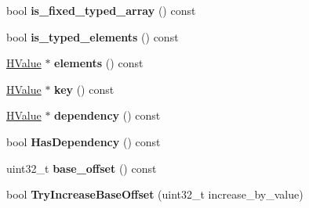 \begin{DoxyCompactItemize}
\item 
\hypertarget{classv8_1_1internal_1_1_v8___f_i_n_a_l_ab3329241dbd5a19616fb0a0346af317d}{}bool {\bfseries is\+\_\+fixed\+\_\+typed\+\_\+array} () const \label{classv8_1_1internal_1_1_v8___f_i_n_a_l_ab3329241dbd5a19616fb0a0346af317d}

\item 
\hypertarget{classv8_1_1internal_1_1_v8___f_i_n_a_l_a558e6bb397abd3937d39e3941acd7ea9}{}bool {\bfseries is\+\_\+typed\+\_\+elements} () const \label{classv8_1_1internal_1_1_v8___f_i_n_a_l_a558e6bb397abd3937d39e3941acd7ea9}

\item 
\hypertarget{classv8_1_1internal_1_1_v8___f_i_n_a_l_a91287e8759f25c1fd30e3bc43b1d0582}{}\hyperlink{classv8_1_1internal_1_1_h_value}{H\+Value} $\ast$ {\bfseries elements} () const \label{classv8_1_1internal_1_1_v8___f_i_n_a_l_a91287e8759f25c1fd30e3bc43b1d0582}

\item 
\hypertarget{classv8_1_1internal_1_1_v8___f_i_n_a_l_aecac5f6b59aaff1b8ba60417c772e136}{}\hyperlink{classv8_1_1internal_1_1_h_value}{H\+Value} $\ast$ {\bfseries key} () const \label{classv8_1_1internal_1_1_v8___f_i_n_a_l_aecac5f6b59aaff1b8ba60417c772e136}

\item 
\hypertarget{classv8_1_1internal_1_1_v8___f_i_n_a_l_a2dc4fa79ff1b05f63414663e54be99fd}{}\hyperlink{classv8_1_1internal_1_1_h_value}{H\+Value} $\ast$ {\bfseries dependency} () const \label{classv8_1_1internal_1_1_v8___f_i_n_a_l_a2dc4fa79ff1b05f63414663e54be99fd}

\item 
\hypertarget{classv8_1_1internal_1_1_v8___f_i_n_a_l_afa85f10e0771e676cbc3526f47ab6855}{}bool {\bfseries Has\+Dependency} () const \label{classv8_1_1internal_1_1_v8___f_i_n_a_l_afa85f10e0771e676cbc3526f47ab6855}

\item 
\hypertarget{classv8_1_1internal_1_1_v8___f_i_n_a_l_a00906b3ab3463ca74c5999407333630a}{}uint32\+\_\+t {\bfseries base\+\_\+offset} () const \label{classv8_1_1internal_1_1_v8___f_i_n_a_l_a00906b3ab3463ca74c5999407333630a}

\item 
\hypertarget{classv8_1_1internal_1_1_v8___f_i_n_a_l_a943c0223511d61d641b36e93ec188f3a}{}bool {\bfseries Try\+Increase\+Base\+Offset} (uint32\+\_\+t increase\+\_\+by\+\_\+value)\label{classv8_1_1internal_1_1_v8___f_i_n_a_l_a943c0223511d61d641b36e93ec188f3a}


\end{DoxyCompactItemize}
